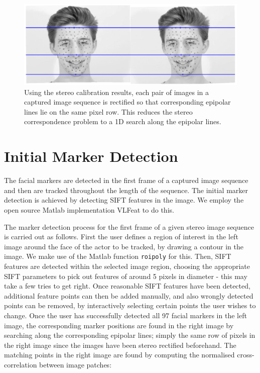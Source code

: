 \begin{figure}[htbp!]
\centering
\includegraphics[width=\textwidth]{img/epipolarlines}
	\caption{Using the stereo calibration results, each pair of images in a captured image sequence is rectified so that corresponding epipolar lines lie on the same pixel row. This reduces the stereo correspondence problem to a 1D search along the epipolar lines.}
	\label{fig:epipolarlines}
\end{figure}

\section{Initial Marker Detection}

The facial markers are detected in the first frame of a captured image sequence and then are tracked throughout the length of the sequence. The initial marker detection is achieved by detecting SIFT features in the image. We employ the open source Matlab implementation VLFeat \cite{vedaldi08vlfeat} to do this. 

The marker detection process for the first frame of a given stereo image sequence is carried out as follows. First the user defines a region of interest in the left image around the face of the actor to be tracked, by drawing a contour in the image. We make use of the Matlab function \texttt{roipoly} for this. Then, SIFT features are detected within the selected image region, choosing the appropriate SIFT parameters to pick out features of around 5 pixels in diameter - this may take a few tries to get right. Once reasonable SIFT features have been detected, additional feature points can then be added manually, and also wrongly detected points can be removed, by interactively selecting certain points the user wishes to change. Once the user has successfully detected all 97 facial markers in the left image, the corresponding marker positions are found in the right image by searching along the corresponding epipolar lines; simply the same row of pixels in the right image since the images have been stereo rectified beforehand. The matching points in the right image are found by computing the normalised cross-correlation between image patches:

